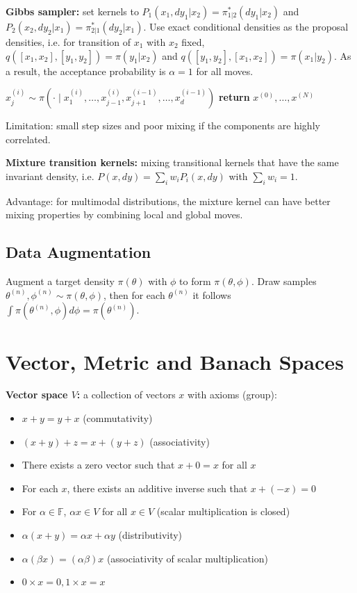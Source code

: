 \documentclass[12pt]{article}
\begin{document}
\textbf{Gibbs sampler:} set kernels to $P_1(x_1, dy_1 | x_2) = \pi^*_{1|2}(dy_1 | x_2)$ and $P_2(x_2, dy_2 | x_1) = \pi^*_{2|1}(dy_2 | x_1)$. Use exact conditional densities as the proposal densities, i.e. for transition of $x_1$ with $x_2$ fixed, $q([x_1, x_2], [y_1, y_2]) = \pi(y_1 | x_2)$ and $q([y_1, y_2],[x_1, x_2]) = \pi(x_1 | y_2)$. As a result, the acceptance probability is $\alpha = 1$ for all moves.

\begin{algorithm}
\caption{Gibbs Sampler}
\begin{algorithmic}[1]
     
        \State $x^{(i)}_j \sim \pi(\cdot \mid x^{(i)}_1, \dots, x^{(i)}_{j-1}, x^{(i-1)}_{j+1}, \dots, x^{(i-1)}_d)$ 
    \EndFor
\EndFor
\State \textbf{return} $x^{(0)}, \dots, x^{(N)}$
\end{algorithmic}
\end{algorithm}

Limitation: small step sizes and poor mixing if the components are highly correlated.

\textbf{Mixture transition kernels:} mixing transitional kernels that have the same invariant density, i.e. $P(x, dy) = \sum_i w_i P_i(x, dy)$ with $\sum_i w_i = 1$.

Advantage: for multimodal distributions, the mixture kernel can have better mixing properties by combining local and global moves.

\subsection{Data Augmentation}
Augment a target density $\pi(\theta)$ with $\phi$ to form $\pi(\theta, \phi)$. Draw samples $\theta^{(n)}, \phi^{(n)} \sim \pi(\theta, \phi)$, then for each $\theta^{(n)}$ it follows $\int \pi(\theta^{(n)}, \phi) d\phi = \pi(\theta^{(n)})$.
\section{Vector, Metric and Banach Spaces}
\textbf{Vector space $V$:} a collection of vectors $x$ with axioms (group):
\begin{itemize}
    \item $x + y = y + x$ (commutativity)
    \item $(x + y) + z = x + (y + z)$ (associativity)
    \item There exists a zero vector such that $x + 0 = x$ for all $x$
    \item For each $x$, there exists an additive inverse such that $x + (-x) = 0$
    \item For $\alpha \in \mathbb{F}$, $\alpha x \in V$ for all $x \in V$ (scalar multiplication is closed)
    \item $\alpha (x + y) = \alpha x + \alpha y$ (distributivity)
    \item $\alpha (\beta x) = (\alpha \beta) x$ (associativity of scalar multiplication)
    \item $0 \times x = 0, 1 \times x = x$
\end{itemize}
\end{document}
